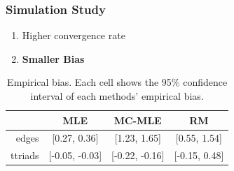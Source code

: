 \documentclass[aspectratio=169, 9pt, handout]{beamer}
\begin{document}
\begin{frame}[t, label=ergmitoexperiment]
	\frametitle{Simulation Study}
	
	\begin{minipage}[t]{.3\linewidth}
		\begin{enumerate}
			\item Higher convergence rate
			\item \alert{\bf Smaller Bias}
		\end{enumerate}
		\vfill\hyperlink{ergmito-checklist}{}
	\end{minipage}
	\vfill\hfill\begin{minipage}[t]{.65\linewidth}\vspace{-.75cm}
		\begin{table}
			\centering
			\begin{tabular}{rccc}
				\toprule
				& MLE & MC-MLE & RM \\ 
				\midrule
				edges & [0.27, 0.36] & [1.23, 1.65] & [0.55, 1.54] \\ 
				ttriads & [-0.05, -0.03] & [-0.22, -0.16] & [-0.15, 0.48] \\ 
				\bottomrule
			\end{tabular}
			\caption[Empirical Biases per Method]{\label{tab:empirical-bias-sim}Empirical bias. Each cell shows the 95\% confidence interval of each methods' empirical bias.} 
		\end{table}
		
		\hfill\hyperlink{ergmito-bias}{}
	\end{minipage}
\end{frame}
\end{document}
